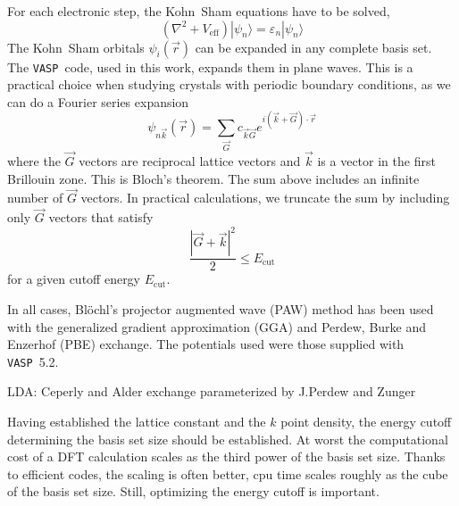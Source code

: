\documentclass[11pt,bibliography=totoc,index=totoc]{scrbook}   %
\newcommand{\vasp}{{\texttt{VASP}}} %
\begin{document}
For each electronic step, the Kohn~Sham equations have to be solved,
\begin{equation}
  (\nabla^2 + V_{\text{eff}}) |\psi_n\rangle = \varepsilon_n |\psi_n\rangle
\end{equation}
The Kohn~Sham orbitals $\psi_i(\vec{r})$ can be expanded in any complete basis set. 
The \vasp\ code, used in this work, expands them in plane waves. 
This is a practical choice when studying crystals with periodic boundary conditions, as we can do a Fourier series expansion
\begin{equation}
  \psi_{n\vec{k}}(\vec{r}) = \sum_{\vec{G}} c_{\vec{k}\vec{G}} e^{i(\vec{k}+\vec{G})\cdot\vec{r}}
\end{equation}
where the $\vec{G}$ vectors are reciprocal lattice vectors and $\vec{k}$ is a vector in the first Brillouin zone.
This is Bloch's theorem. The sum above includes an infinite number of $\vec{G}$ vectors. In practical calculations, we
truncate the sum by including only $\vec{G}$ vectors that satisfy
\begin{equation}
  \frac{|\vec{G}+\vec{k}|^2}{2} \leq E_{\text{cut}}
\end{equation}
for a given cutoff energy $E_{\text{cut}}$.

In all cases, Blöchl's projector augmented wave (PAW) method\cite{Blochl:1994,Kresse:1999} has been used with the generalized gradient approximation (GGA) 
and Perdew, Burke and Enzerhof (PBE) exchange. The potentials used were those supplied with \vasp\ 5.2.


LDA: Ceperly and Alder exchange parameterized by J.Perdew and Zunger

Having established the lattice constant and the $k$ point density, the energy cutoff determining the basis set size
should be established.
At worst the computational cost of a DFT calculation scales as the third power of the basis set size. 
Thanks to efficient codes, the scaling is often better, 
cpu time scales roughly as the cube of the basis set size. Still, optimizing the energy cutoff is important.

\end{document}
